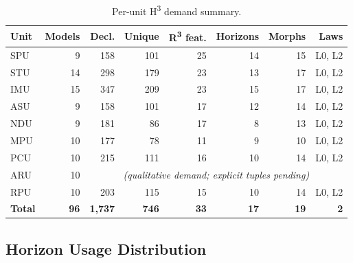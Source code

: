 \begin{table}[H]
\centering
\caption{Per-unit H\textsuperscript{3} demand summary.}
\label{tab:unit-demand-summary}
\renewcommand{\arraystretch}{1.15}
\begin{tabular}{@{}lrrrrrrr@{}}
\toprule
\textbf{Unit} & \textbf{Models} & \textbf{Decl.} & \textbf{Unique}
  & \textbf{R\textsuperscript{3} feat.} & \textbf{Horizons}
  & \textbf{Morphs} & \textbf{Laws} \\
\midrule
\rowcolor{grpA!20}
SPU &  9 & 158 & 101 & 25 & 14 & 15 & L0, L2 \\
\rowcolor{grpB!20}
STU & 14 & 298 & 179 & 23 & 13 & 17 & L0, L2 \\
\rowcolor{grpC!20}
IMU & 15 & 347 & 209 & 23 & 15 & 17 & L0, L2 \\
\rowcolor{grpD!20}
ASU &  9 & 158 & 101 & 17 & 12 & 14 & L0, L2 \\
\rowcolor{grpE!20}
NDU &  9 & 181 &  86 & 17 &  8 & 13 & L0, L2 \\
\rowcolor{grpF!20}
MPU & 10 & 177 &  78 & 11 &  9 & 10 & L0, L2 \\
\rowcolor{grpG!20}
PCU & 10 & 215 & 111 & 16 & 10 & 14 & L0, L2 \\
\rowcolor{grpH!20}
ARU & 10 & \multicolumn{6}{c}{\itshape (qualitative demand; explicit tuples pending)} \\
\rowcolor{grpI!20}
RPU & 10 & 203 & 115 & 15 & 10 & 14 & L0, L2 \\
\midrule
\textbf{Total} & \textbf{96} & \textbf{1{,}737} & \textbf{746}
  & \textbf{33} & \textbf{17} & \textbf{19} & \textbf{2} \\
\bottomrule
\end{tabular}
\end{table}


\subsection{Horizon Usage Distribution}
\label{subsec:routing-horizons}

